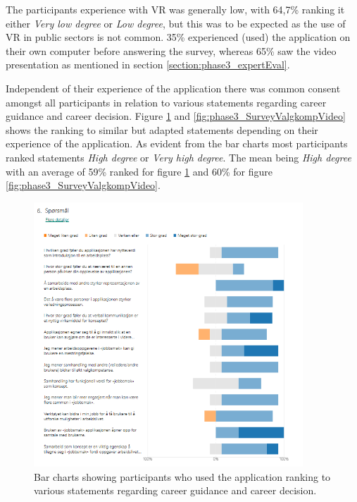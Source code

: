 The participants experience with VR was generally low, with 64,7\% ranking it either \textit{Very low degree} or \textit{Low degree}, but this was to be expected as the use of VR in public sectors is not common. 35\% experienced (used) the application on their own computer before answering the survey, whereas 65\% saw the video presentation as mentioned in section \ref{section:phase3_expertEval}.  



Independent of their experience of the application there was common consent amongst all participants in relation to various statements regarding career guidance and career decision. Figure \ref{fig:phase3_SurveyValgkompApp} and \ref{fig:phase3_SurveyValgkompVideo} shows the ranking to similar but adapted statements depending on their experience of the application. As evident from the bar charts most participants ranked statements \textit{High degree} or \textit{Very high degree}. The mean being \textit{High degree} with an average of 59\% ranked for figure \ref{fig:phase3_SurveyValgkompApp} and 60\% for figure \ref{fig:phase3_SurveyValgkompVideo}.

\begin{figure}[H]
  \centering
   \captionsetup{width=.8\linewidth}
    \includegraphics[width=0.9\textwidth]{fig/phase_3/survey/valgKompentanseApp.PNG}
 \caption{Bar charts showing participants who used the application ranking to various statements regarding career guidance and career decision.}
\label{fig:phase3_SurveyValgkompApp}
\end{figure}


